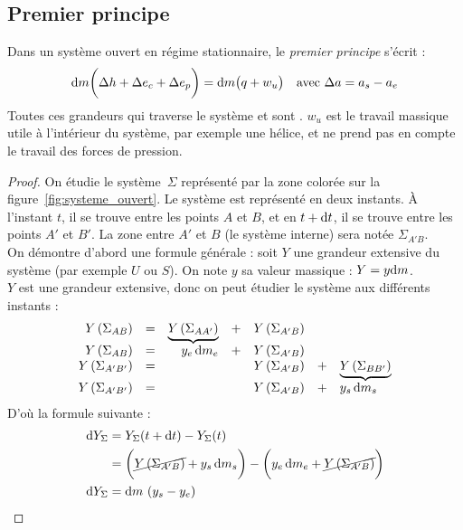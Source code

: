 \documentclass[11pt,a4paper,fleqn,pdftex]{report}
\begin{document}
\subsection{Premier principe}
\begin{itheorem}
   Dans un système ouvert en régime stationnaire, le \emph{premier principe} s'écrit : 
   \begin{equation}
   \mathrm{d} m \bigg( \Delta h + \Delta e_c +\Delta e_p \bigg) = \mathrm{d} m \big( q + w_u \big)\\ \quad\text{avec }\Delta a = a_s - a_e
   \end{equation}
   Toutes ces grandeurs  qui traverse le système et sont . $w_u$ est le travail massique utile à l'intérieur du système, par exemple une hélice, et ne prend pas en compte le travail des forces de pression.\\ %
\end{itheorem}
\begin{proof}
   On étudie le système~$\Sigma$ représenté par la zone \textcolor{couleurClaire}{colorée} sur la figure~\ref{fig:systeme_ouvert}. Le système est représenté en deux instants. À l'instant $t$, il se trouve entre les points $A$ et $B$, et en $t+\mathrm{d} t$, il se trouve entre les points $A'$ et $B'$. La zone entre $A'$ et $B$ (le système interne) sera notée $\Sigma_{A'B}$.\\
   On démontre d'abord une formule générale : soit $Y$ une grandeur extensive du système (par exemple $U$ ou $S$). On note $y$ sa valeur massique : $Y = y\mathrm{d} m$. \\
   $Y$ est une grandeur extensive, donc on peut étudier le système aux différents instants :
   \[
   \begin{array}{r c r c c c l}
   Y\left( \Sigma_{AB}\right) &=& \underbrace{Y \left( \Sigma_{AA'} \right)}  &+& Y\left( \Sigma_{A'B}\right)& \\
   Y\left( \Sigma_{AB}\right) &=& y_e\, \mathrm{d} m_e &+& Y\left( \Sigma_{A'B}\right)& \\
   Y\left( \Sigma_{A'B'}\right) &=& &&Y\left( \Sigma_{A'B}\right) &+& \underbrace{Y \left( \Sigma_{BB'} \right) } \\
   Y\left( \Sigma_{A'B'}\right) &=& &&Y\left( \Sigma_{A'B}\right) &+& y_s\, \mathrm{d} m_s
   \end{array}
   \]
   D'où la formule suivante :
   \begin{align*}
     \mathrm{d} Y_\Sigma &= Y_\Sigma(t+\mathrm{d} t) - Y_\Sigma (t) \\
                 &= \bigg( \cancel{Y\left( \Sigma_{A'B}\right)} + y_s\, \mathrm{d} m_s \bigg) - \bigg( y_e\, \mathrm{d} m_e + \cancel{Y\left( \Sigma_{A'B}\right)} \bigg) \\
     \mathrm{d} Y_\Sigma &= \mathrm{d} m ~ (y_s - y_e)
   \end{align*}

\end{proof}
\end{document}
